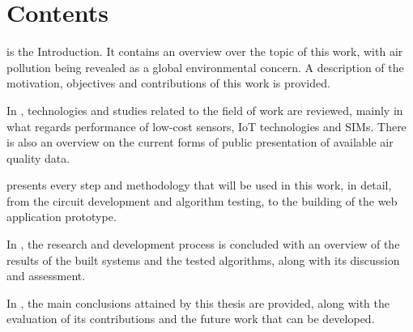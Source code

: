 \section{Contents}

 is the Introduction. It contains an overview over the topic of this work, with air pollution being revealed as a global environmental concern. A description of the motivation, objectives and contributions of this work is provided.

In , technologies and studies related to the field of work are reviewed, mainly in what regards performance of low-cost sensors, IoT technologies and SIMs. There is also an overview on the current forms of public presentation of available air quality data.

 presents every step and methodology that will be used in this work, in detail, from the circuit development and algorithm testing, to the building of the web application prototype.

In , the research and development process is concluded with an overview of the results of the built systems and the tested algorithms, along with its discussion and assessment.

In , the main conclusions attained by this thesis are provided, along with the evaluation of its contributions and the future work that can be developed.